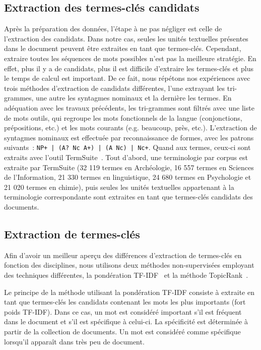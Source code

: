   \subsection{Extraction des termes-clés candidats}
  \label{subsec:extraction_des_termes_cles_candidats}
    Après la préparation des données, l'étape à ne pas négliger est celle
    de l'extraction des candidats. Dans notre cas, seules les unités textuelles
    présentes dans le document peuvent être extraites en tant que termes-clés.
    Cependant, extraire toutes les séquences de mots possibles n'est pas la
    meilleure stratégie. En effet, plus il y a de candidats, plus il est
    difficile d'extraire les termes-clés et plus le temps de calcul est
    important. De ce fait, nous répétons nos expériences avec trois méthodes
    d'extraction de candidats différentes, l'une extrayant les tri-grammes, une
    autre les syntagmes nominaux et la dernière les termes. En adéquation avec
    les travaux précédents, les tri-grammes sont filtrés avec une liste de mots
    outils, qui regroupe les mots fonctionnels de la langue (conjonctions,
    prépositions, etc.) et les mots courants (e.g. \og{}beaucoup\fg{},
    \og{}près\fg{}, etc.). L'extraction de syntagmes nominaux est effectuée par
    reconnaissance de formes, avec les patrons suivants~: \texttt{NP+~|
    (A?~Nc~A+)~| (A~Nc)~| Nc+}. Quand aux termes, ceux-ci sont extraits avec
    l'outil TermSuite~\cite{rocheteau2011termsuite}. Tout d'abord, une
    terminologie par corpus est extraite par TermSuite (32 119 termes en
    Archéologie, 16 557 termes en Sciences de l'Information, 21 330 termes en
    linguistique, 24 680 termes en Psychologie et 21 020 termes en chimie), puis
    seules les unités textuelles appartenant à la terminologie correspondante
    sont extraites en tant que termes-clés candidats des documents.

  \subsection{Extraction de termes-clés}
  \label{subsec:extraction_de_termes_cles}
    Afin d'avoir un meilleur aperçu des différences d'extraction de termes-clés
    en fonction des disciplines, nous utilisons deux méthodes non-supervisées
    employant des techniques différentes, la pondération
    TF-IDF~\cite{jones1972tfidf} et la méthode
    TopicRank~\cite{bougouin2013topicrank}.

    Le principe de la méthode utilisant la pondération TF-IDF consiste à
    extraite en tant que termes-clés les candidats contenant les mots les plus
    importants (fort poids TF-IDF). Dans ce cas, un mot est considéré important
    s'il est fréquent dans le document et s'il est spécifique à celui-ci. La
    spécificité est déterminée à partir de la collection de documents. Un mot
    est considéré comme spécifique lorsqu'il apparaît dans très peu de document.

